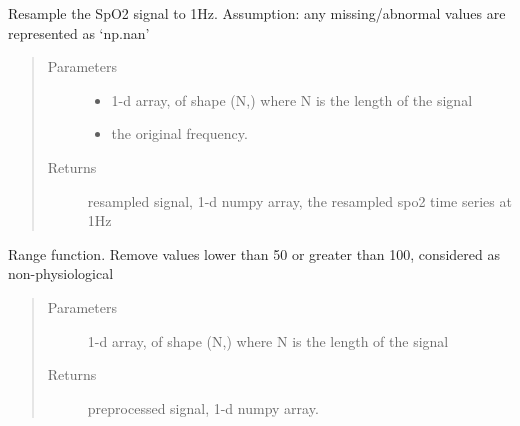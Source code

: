 \documentclass[letterpaper,10pt,english]{sphinxmanual}
\begin{document}
\begin{fulllineitems}
\label{\detokenize{OBM:OBM.Preprocessing.resamp_spo2}}
Resample the SpO2 signal to 1Hz.
Assumption: any missing/abnormal values are represented as ‘np.nan’
\begin{quote}\begin{description}
\item[{Parameters}] \leavevmode\begin{itemize}
\item {} 
 \textendash{} 1-d array, of shape (N,) where N is the length of the signal

\item {} 
 \textendash{} the original frequency.

\end{itemize}

\item[{Returns}] \leavevmode
resampled signal, 1-d numpy array, the resampled spo2 time series at 1Hz

\end{description}\end{quote}

\end{fulllineitems}


\begin{fulllineitems}
\label{\detokenize{OBM:OBM.Preprocessing.set_range}}
Range function. Remove values lower than 50 or greater than 100, considered as non-physiological
\begin{quote}\begin{description}
\item[{Parameters}] \leavevmode
{} \textendash{} 1-d array, of shape (N,) where N is the length of the signal

\item[{Returns}] \leavevmode
preprocessed signal, 1-d numpy array.

\end{description}\end{quote}

\end{fulllineitems}
\end{document}
